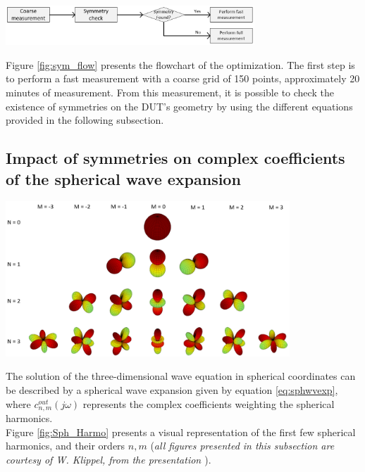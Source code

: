\documentclass{report}
\begin{document}
\begin{center}
	\includegraphics[width=0.7\textwidth]{Sym/flowchart} 
    \captionsetup{hypcap=false} 
	\label{fig:sym_flow}
\end{center}

Figure \ref{fig:sym_flow} presents the flowchart of the optimization. The first step is to perform a fast measurement with a coarse grid of 150 points, approximately 20 minutes of measurement. From this measurement, it is possible to check the existence of symmetries on the DUT's geometry by using the different equations provided in the following subsection. 

\subsection{Impact of symmetries on complex coefficients of the spherical wave expansion}
\label{chap:sym}

\begin{minipage}{0.5\textwidth}
\begin{center}
	\includegraphics[width=0.8\textwidth]{Appendix/Spherical_Harmo}
    \captionsetup{hypcap=false}
    \label{fig:Sph_Harmo}
\end{center}
\end{minipage}
\begin{minipage}{0.5\textwidth}
The solution of the three-dimensional wave equation in spherical coordinates can be described by a spherical wave expansion given by equation \ref{eq:sphwvexp}, where $c_{n,m}^{out}(j \omega)$ represents the complex coefficients weighting the spherical harmonics.\\

Figure \ref{fig:Sph_Harmo} presents a visual representation of the first few spherical harmonics, and their orders $n,m$ (\textit{all figures presented in this subsection are courtesy of W. Klippel, from the presentation \cite{lect2018}}). 
\end{minipage}
\vspace{0.4cm}
\end{document}
